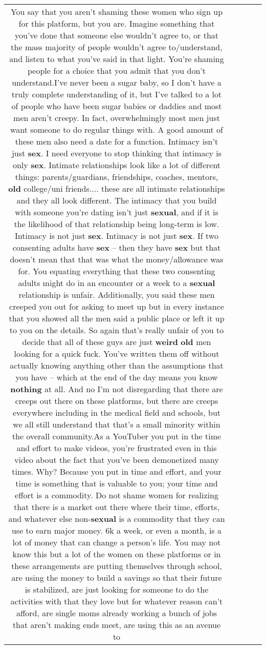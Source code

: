 \documentclass[11pt]{article}
\newlength\mylength
\begin{document}
\begin{center}
\begin{longtable}{|C{.65\mylength}|C{.30\mylength}|C{.12\mylength}|C{.12\mylength}|C{.12\mylength}|}
  \small You say that you aren't shaming these women who sign up for this platform, but you are. Imagine something that you've done that someone else wouldn't agree to, or that the mass majority of people wouldn't agree to/understand, and listen to what you've said in that light. You're shaming people for a choice that you admit that you don't understand.I've never been a sugar baby, so I don't have a truly complete understanding of it, but I've talked to a lot of people who have been sugar babies or daddies and most men aren't creepy. In fact, overwhelmingly most men just want someone to do regular things with. A good amount of these men also need a date for a function. Intimacy isn't just \textbf{sex}. I need everyone to stop thinking that intimacy is only \textbf{sex}. Intimate relationships look like a lot of different things: parents/guardians, friendships, coaches, mentors, \textbf{old} college/uni friends.... these are all intimate relationships and they all look different. The intimacy that you build with someone you're dating isn't just \textbf{sexual}, and if it is the likelihood of that relationship being long-term is low. Intimacy is not just \textbf{sex}. Intimacy is not just \textbf{sex}. If two consenting adults have \textbf{sex} -- then they have \textbf{sex} but that doesn't mean that that was what the money/allowance was for. You equating everything that these two consenting adults might do in an encounter or a week to a \textbf{sexual} relationship is unfair. Additionally, you said these men creeped you out for asking to meet up but in every instance that you showed all the men said a public place or left it up to you on the details. So again that's really unfair of you to decide that all of these guys are just \textbf{weird} \textbf{old} men looking for a quick fuck. You've written them off without actually knowing anything other than the assumptions that you have -- which at the end of the day means you know \textbf{nothing} at all. And no I'm not disregarding that there are creeps out there on these platforms, but there are creeps everywhere including in the medical field and schools, but we all still understand that that's a small minority within the overall community.As a YouTuber you put in the time and effort to make videos, you're frustrated even in this video about the fact that you've been demonetized many times. Why? Because you put in time and effort, and your time is something that is valuable to you; your time and effort is a commodity. Do not shame women for realizing that there is a market out there where their time, efforts, and whatever else non-\textbf{sexual} is a commodity that they can use to earn major money. 6k a week, or even a month, is a lot of money that can change a person's life. You may not know this but a lot of the women on these platforms or in these arrangements are putting themselves through school, are using the money to build a savings so that their future is stabilized, are just looking for someone to do the activities with that they love but for whatever reason can't afford, are single moms already working a bunch of jobs that aren't making ends meet, are using this as an avenue to 
\end{longtable}
\end{center}
\end{document}
